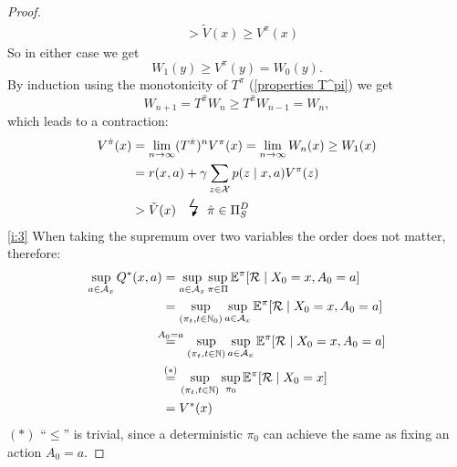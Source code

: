 \begin{proof}
\begin{align*}
		&> \tilde{V}(x) \ge V^\pi(x)
	\end{align*}
	So in either case we get 
	\[ 
		W_1(y)\ge V^\pi(y)=W_0(y).
	\]
	By induction using the monotonicity of \(T^\pi\) (\ref{properties T^pi}) we get 
	\[
		W_{n+1}=T^{\hat{\pi}}W_n \ge T^{\hat{\pi}}W_{n-1}=W_n,
	\] 
	which leads to a contraction:
	\begin{align*}
		V^{\hat{\pi}}(x)&=\lim_{n\to\infty}(T^{\hat{\pi}})^n V^\pi(x)=\lim_{n\to\infty} W_n(x)\ge W_1(x) \\
		&=r(x, a) + \gamma \sum_{z\in\cX} p(z \mid x, a) V^\pi(z) \\
		&> \tilde{V}(x) \contradiction{\hat{\pi}\in\detPolicy}
	\end{align*}
	\ref{i:3} When taking the supremum over two variables the order does not matter, therefore:
	\begin{align}
		\sup_{a\in\cA_x} Q^*(x,a) 
		\nonumber
		&= \sup_{a\in\cA_x} \sup_{\pi\in\Pi}\E^\pi[\cR\mid X_0=x, A_0=a]
		\nonumber \\
		&=\sup_{(\pi_t,t\in\N_0)}\sup_{a\in\cA_x}\E^\pi[\cR\mid X_0=x, A_0=a]
		\nonumber\\
		&\lxeq{A_0=a}\sup_{(\pi_t,t\in\N)}\sup_{a\in\cA_x}\E^\pi[\cR\mid X_0=x, A_0=a]
		\nonumber\\
		&\lxeq{(*)}\sup_{(\pi_t,t\in\N)}\sup_{\pi_0}\E^\pi[\cR\mid X_0=x]
		\label{clarifiction:sup pi_0 = sup_a}\\
		&=V^*(x) \nonumber
	\end{align}
	\((*)\) ``\(\leq\)'' is trivial, since a deterministic \(\pi_0\) can achieve the same as fixing an action \(A_0=a\).


\end{proof}

